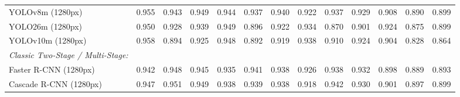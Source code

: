 \documentclass[10pt,journal,compsoc]{IEEEtran}
\begin{document}
\begin{table}[t]
{\begin{tabular}{l c c c c c c c c c c c c}
YOLOv8m (1280px) & 0.955 & 0.943 & 0.949 & 0.944 & 0.937 & 0.940 & 0.922 & 0.937 & 0.929 & 0.908 & 0.890 & 0.899 \\
YOLO26m (1280px) & 0.950 & 0.928 & 0.939 & 0.949 & 0.896 & 0.922 & 0.934 & 0.870 & 0.901 & 0.924 & 0.875 & 0.899 \\
YOLOv10m (1280px) & 0.958 & 0.894 & 0.925 & 0.948 & 0.892 & 0.919 & 0.938 & 0.910 & 0.924 & 0.904 & 0.828 & 0.864 \\
\midrule
\textit{Classic Two-Stage / Multi-Stage:} & & & & & & & & & & & & \\
Faster R-CNN (1280px) & 0.942 & 0.948 & 0.945 & 0.935 & 0.941 & 0.938 & 0.926 & 0.938 & 0.932 & 0.898 & 0.889 & 0.893 \\
Cascade R-CNN (1280px) & 0.947 & 0.951 & 0.949 & 0.938 & 0.939 & 0.938 & 0.918 & 0.942 & 0.930 & 0.901 & 0.897 & 0.899 \\
\bottomrule
\end{tabular}}
\end{table}
\end{document}
